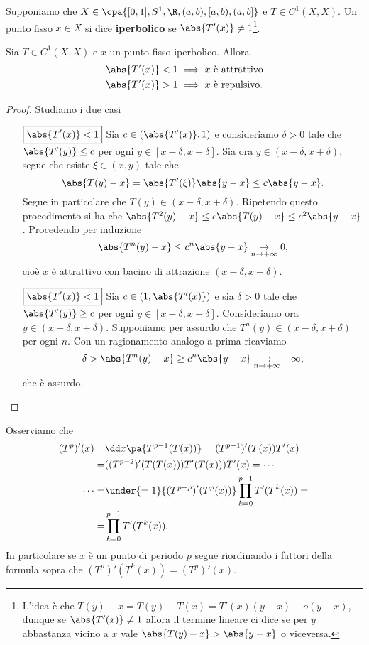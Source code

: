 \begin{definition}
Supponiamo che $X\in\cpa{[0,1], S^1, \R, (a,b), [a,b), (a,b]}$ e $T\in C^1(X,X)$. Un punto fisso $x\in X$ si dice \textbf{iperbolico} se $\abs{T'(x)}\neq 1$\footnote{L'idea \`e che $T(y)-x=T(y)-T(x)=T'(x)(y-x)+o(y-x)$, dunque se $\abs{T'(x)}\neq 1$ allora il termine lineare ci dice se per $y$ abbastanza vicino a $x$ vale $\abs{T(y)-x}>\abs{y-x}$ o viceversa.}.
\end{definition}

\begin{proposition}\label{RelazioneTraPuntiIperboliciEAttrattivita}
Sia $T\in C^1(X,X)$ e $x$ un punto fisso iperbolico. Allora 
\begin{align*}
\abs{T'(x)}<1&\implies x\text{ \`e attrattivo}\\
\abs{T'(x)}>1&\implies x\text{ \`e repulsivo.}
\end{align*}
\end{proposition}
\begin{proof}
Studiamo i due casi
\setlength{\leftmargini}{0cm}
\begin{itemize}
\item[$\boxed{\abs{T'(x)}<1}$] Sia $c\in (\abs{T'(x)},1)$ e consideriamo $\delta>0$ tale che $\abs{T'(y)}\leq c$ per ogni $y\in [x-\delta,x+\delta]$. Sia ora $y\in (x-\delta,x+\delta)$, segue che esiste $\xi\in (x,y)$ tale che
\[\abs{T(y)-x}=\abs{T'(\xi)}\abs{y-x}\leq c\abs{y-x}.\]
Segue in particolare che $T(y)\in (x-\delta,x+\delta)$. Ripetendo questo procedimento si ha che $\abs{T^2(y)-x}\leq c\abs{T(y)-x}\leq c^2\abs{y-x}$. Procedendo per induzione
\[\abs{T^n(y)-x}\leq c^n\abs{y-x}\underset{n\to+\infty}{\to} 0,\]
cio\`e $x$ \`e attrattivo con bacino di attrazione $(x-\delta,x+\delta)$.
\item[$\boxed{\abs{T'(x)}<1}$] Sia $c\in (1,\abs{T'(x)})$ e sia $\delta>0$ tale che $\abs{T'(y)}\geq c$ per ogni $y\in [x-\delta,x+\delta]$. Consideriamo ora $y\in (x-\delta,x+\delta)$. Supponiamo per assurdo che $T^n(y)\in (x-\delta,x+\delta)$ per ogni $n$. Con un ragionamento analogo a prima ricaviamo
\[\delta>\abs{T^n(y)-x}\geq c^n\abs{y-x}\underset{n\to+\infty}{\to}+\infty,\]
che \`e assurdo.
\end{itemize}
\setlength{\leftmargini}{0.5cm}
\end{proof}

\begin{remark}
Osserviamo che
\begin{align*}
(T^p)'(x)=&\dd x{}\pa{T^{p-1}(T(x))}=(T^{p-1})'(T(x))T'(x)=\\
=&((T^{p-2})'(T(T(x)))T'(T(x)))T'(x)=\cdots\\
\cdots=&\under{=1}{(T^{p-p})'(T^p(x))}\prod_{k=0}^{p-1}T'(T^k(x))=\\
=&\prod_{k=0}^{p-1}T'(T^k(x)).
\end{align*}
In particolare se $x$ \`e un punto di periodo $p$ segue riordinando i fattori della formula sopra che $(T^p)'(T^k(x))=(T^p)'(x)$.
\end{remark}